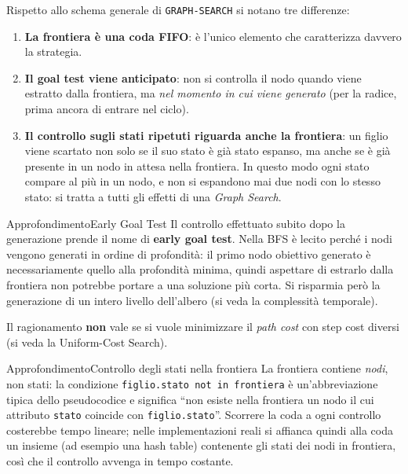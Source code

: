 \documentclass[a4paper, 11pt, oneside]{book}
\theoremstyle{definition}
\begin{document}
	Rispetto allo schema generale di \texttt{GRAPH-SEARCH} si notano tre differenze:
	\begin{enumerate}
		\item \textbf{La frontiera \`e una coda FIFO}: \`e l'unico elemento che
			caratterizza davvero la strategia.

		\item \textbf{Il goal test viene anticipato}: non si controlla il nodo quando
			viene estratto dalla frontiera, ma \emph{nel momento in cui viene generato}
			(per la radice, prima ancora di entrare nel ciclo).

		\item \textbf{Il controllo sugli stati ripetuti riguarda anche la frontiera}: un
			figlio viene scartato non solo se il suo stato \`e gi\`a stato espanso, ma
			anche se \`e gi\`a presente in un nodo in attesa nella frontiera. In questo
			modo ogni stato compare al pi\`u in un nodo, e non si espandono mai due nodi
			con lo stesso stato: si tratta a tutti gli effetti di una \emph{Graph Search}.
	\end{enumerate}

	\begin{nota}
		{Approfondimento}{Early Goal Test}
		Il controllo effettuato subito dopo la generazione prende il nome di
		\textbf{early goal test}. Nella BFS \`e lecito perch\'e i nodi vengono generati in
		ordine di profondit\`a: il primo nodo obiettivo generato \`e necessariamente quello
		alla profondit\`a minima, quindi aspettare di estrarlo dalla frontiera non potrebbe
		portare a una soluzione pi\`u corta. Si risparmia per\`o la generazione di un intero
		livello dell'albero (si veda la complessit\`a temporale).

		Il ragionamento \textbf{non} vale se si vuole minimizzare il \emph{path cost} con
		step cost diversi (si veda la Uniform-Cost Search).
	\end{nota}

	\begin{nota}
		{Approfondimento}{Controllo degli stati nella frontiera}
		La frontiera contiene \emph{nodi}, non stati: la condizione
		\texttt{figlio.stato not in frontiera} \`e un'abbreviazione tipica dello pseudocodice
		e significa ``non esiste nella frontiera un nodo il cui attributo \texttt{stato}
		coincide con \texttt{figlio.stato}''. Scorrere la coda a ogni controllo costerebbe
		tempo lineare; nelle implementazioni reali si affianca quindi alla coda un insieme
		(ad esempio una hash table) contenente gli stati dei nodi in frontiera, cos\`i che
		il controllo avvenga in tempo costante.
	\end{nota}
\end{document}
